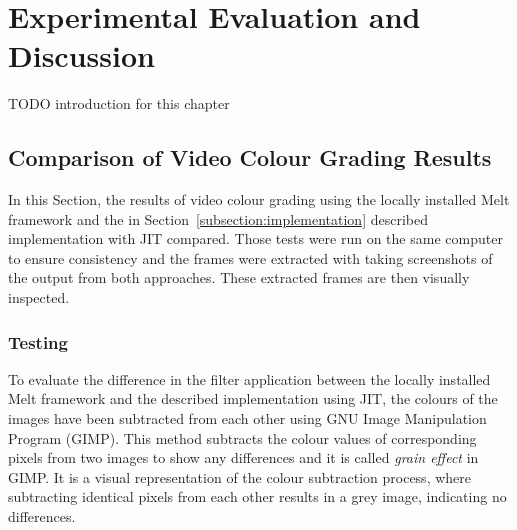 \documentclass[../MasterThesis.tex]{subfiles}
\begin{document}
	
	
%
%
%
%
%
%
%
%
\newpage
\section{Experimental Evaluation and Discussion} \label{section:experimentalevaluationanddiscussion}


TODO introduction for this chapter


\subsection{Comparison of Video Colour Grading Results} \label{subsection:ComparisonVideoColourGradingResults}


In this Section, the results of video colour grading using the locally installed Melt framework and the in Section~\ref{subsection:implementation} described implementation with JIT compared. 
Those tests were run on the same computer to ensure consistency and the frames were extracted with taking screenshots of the output from both approaches. These extracted frames are then visually inspected. 


\subsubsection*{Testing} 


To evaluate the difference in the filter application between the locally installed Melt framework and the described implementation using JIT, the colours of the images have been subtracted from each other using GNU Image Manipulation Program (GIMP). 
This method subtracts the colour values of corresponding pixels from two images to show any differences and it is called \textit{grain effect} in GIMP. It is a visual representation of the colour subtraction process, where subtracting identical pixels from each other results in a grey image, indicating no differences.
\end{document}
